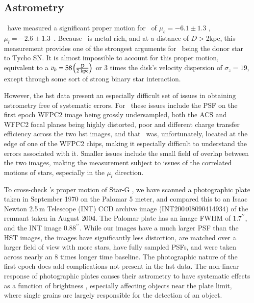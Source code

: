 \subsection{Astrometry}
\rl\ have measured a significant proper motion for \starg\ of $\mu_b=-6.1 \pm 1.3$ \masyr, $\mu_l=-2.6 \pm 1.3$\ \masyr. Because \starg\ is metal rich, and at a distance of $D>2$kpc, this measurement provides one of the strongest arguments for \starg\ being the donor star to Tycho SN. It is almost impossible to account for this proper motion, equivalent to a $v_b=58\left({{D}\over{2\rm{~kpc}}}\right)$\kms\ or 3 times the disk's velocity dispersion of $\sigma_z=19$\kms, except through some sort of strong binary star interaction.  

However, the \gls{hst} data present an especially difficult set of issues in obtaining astrometry free of systematic errors. For \starg\ these issues include the PSF on the first epoch WFPC2 image being grossly undersampled, both the ACS and WFPC2 focal planes being highly distorted,  poor and different charge transfer efficiency across the two \gls{hst} images, and that \starg\ was, unfortunately, located at the edge of one of the WFPC2 chips, making it especially difficult to understand the errors associated with it. Smaller issues include the small field of overlap between the two images, making the measurement subject to issues of the correlated motions of stars, especially in the $\mu_l$ direction.

To cross-check \rl's proper motion of Star-G , we have scanned a photographic plate taken in
September 1970 on the Palomar 5 meter, and compared this to an Isaac
Newton 2.5\,m Telescope (INT) CCD archive image (INT200408090414934) of the remnant taken in
August 2004. The Palomar plate has an image FWHM of $1.7^{\prime\prime}$, and the INT image $0.88^{\prime\prime}$. While our images have a much larger PSF than the HST images, the images have significantly less distortion, are matched over a larger field of view with more stars, have fully sampled PSFs, and were taken across nearly an 8 times longer time baseline. The photographic nature of the first epoch does add complications not present in the \gls{hst} data. The non-linear response of photographic plates causes their astrometry to have systematic effects as a function of brightness \citep{2001ASPC..232..311C}, especially affecting objects near the plate limit, where  single grains are largely responsible for the detection of an object. 


